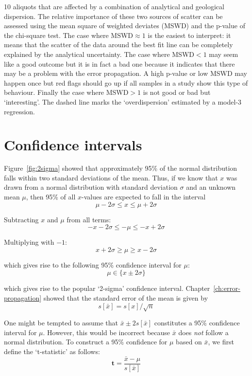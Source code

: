 \begin{refsection}
\begin{minipage}[t]{.6\textwidth}
{    10 aliquots that are affected by a combination of analytical and
    geological dispersion. The relative importance of these two
    sources of scatter can be assessed using the mean square of
    weighted deviates (MSWD) and the p-value of the chi-square
    test. The case where MSWD$\approx{1}$ is the easiest to interpret:
    it means that the scatter of the data around the best fit line can
    be completely explained by the analytical uncertainty. The case
    where MSWD$<{1}$ may seem like a good outcome but it is in fact a
    bad one because it indicates that there may be a problem with the
    error propagation. A high p-value or low MSWD may happen once but
    red flags should go up if all samples in a study show this type of
    behaviour. Finally the case where MSWD$>{1}$ is not good or bad
    but `interesting'. The dashed line marks the `overdispersion'
    estimated by a model-3 regression.}
  \label{fig:isochronMSWD}
\end{minipage}

\section{Confidence intervals}
\label{sec:CI}

Figure~\ref{fig:2sigma} showed that approximately 95\% of the normal
distribution falls within two standard deviations of the mean. Thus,
if we know that $x$ was drawn from a normal distribution with standard
deviation $\sigma$ and an unknown mean $\mu$, then 95\% of all $x$-values
are expected to fall in the interval
\[
\mu - 2\sigma \leq x \leq \mu + 2\sigma
\]

Subtracting $x$ and $\mu$ from all terms:
\[
-x - 2\sigma \leq -\mu \leq -x + 2\sigma
\]

Multiplying with $-1$:
\[
x + 2\sigma \geq \mu \geq x - 2\sigma
\]

\noindent which gives rise to the following 95\% confidence interval
for $\mu$:
\[
\mu \in \{ x \pm 2\sigma \}
\]

\noindent which gives rise to the popular `2-sigma' confidence
interval.  Chapter~\ref{ch:error-propagation} showed that the standard
error of the mean is given by
\[
s[\bar{x}] = s[x]/\sqrt{n}
\]

One might be tempted to assume that $\bar{x} \pm 2 s[\bar{x}]$
constitutes a 95\% confidence interval for $\mu$. However, this would
be incorrect because $\bar{x}$ does \emph{not} follow a normal
distribution. To construct a 95\% confidence for $\mu$ based on
$\bar{x}$, we first define the `t-statistic' as follows:
\begin{equation}
  \mathbf{t} = \frac{\bar{x}-\mu}{s[\bar{x}]}
  \label{eq:tstat}
\end{equation}


\end{refsection}
